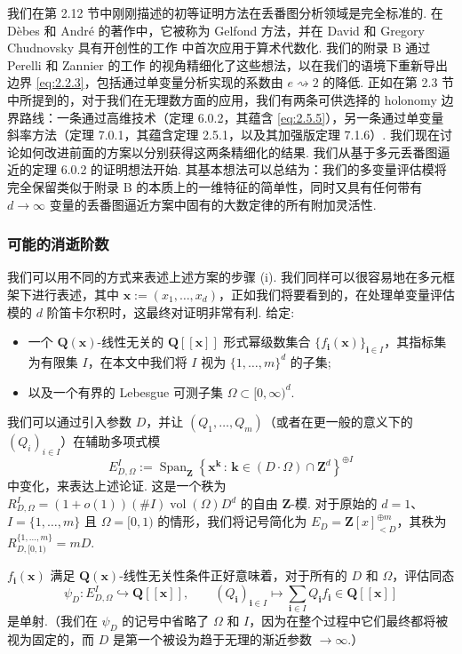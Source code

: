 我们在第 2.12 节中刚刚描述的初等证明方法在丢番图分析领域是完全标准的. 在 Dèbes \cite{Deb86} 和 André \cite[§ VIII.3]{And89} 的著作中，它被称为 Gelfond 方法，并在 David 和 Gregory Chudnovsky 具有开创性的工作 \cite{CC85b, CC85c} 中首次应用于算术代数化. 我们的附录 B 通过 Perelli 和 Zannier 的工作 \cite{PZ84} 的视角精细化了这些想法，以在我们的语境下重新导出边界 \eqref{eq:2.2.3}，包括通过单变量分析实现的系数由 $e \rightsquigarrow 2$ 的降低. 正如在第 2.3 节中所提到的，对于我们在无理数方面的应用，我们有两条可供选择的 holonomy 边界路线：一条通过高维技术（定理 6.0.2，其蕴含 \eqref{eq:2.5.5}），另一条通过单变量斜率方法（定理 7.0.1，其蕴含定理 2.5.1，以及其加强版定理 7.1.6）. 我们现在讨论如何改进前面的方案以分别获得这两条精细化的结果. 我们从基于多元丢番图逼近的定理 6.0.2 的证明想法开始. 其基本想法可以总结为：我们的多变量评估模将完全保留类似于附录 B 的本质上的一维特征的简单性，同时又具有任何带有 $d \to \infty$ 变量的丢番图逼近方案中固有的大数定律的所有附加灵活性.

\subsubsection{可能的消逝阶数}\label{sec:2.13.1}
我们可以用不同的方式来表述上述方案的步骤 (i). 我们同样可以很容易地在多元框架下进行表述，其中 $\mathbf{x} := (x_1, \dots, x_d)$，正如我们将要看到的，在处理单变量评估模的 $d$ 阶笛卡尔积时，这最终对证明非常有利. 给定:
\begin{itemize}
  \item 一个 $\mathbf{Q}(\mathbf{x})$-线性无关的 $\mathbf{Q}[\![\mathbf{x}]\!]$ 形式幂级数集合 $\{f_{\mathbf{i}}(\mathbf{x})\}_{\mathbf{i}\in I}$，其指标集为有限集 $I$，在本文中我们将 $I$ 视为 $\{1,\dots,m\}^d$ 的子集;
  \item 以及一个有界的 Lebesgue 可测子集 $\Omega \subset [0, \infty)^d$.
\end{itemize}
我们可以通过引入参数 $D$，并让 $(Q_1, \dots, Q_m)$（或者在更一般的意义下的 $(Q_i)_{i \in I}$）在辅助多项式模
\[ E_{D,\Omega}^I := \operatorname{Span}_{\mathbf{Z}} \left\{ \mathbf{x}^{\mathbf{k}} \, : \, \mathbf{k} \in (D \cdot \Omega) \cap \mathbf{Z}^d \right\}^{\oplus I} \]
中变化，来表达上述论证. 这是一个秩为 $R_{D,\Omega}^I = (1+o(1))(\#I)\operatorname{vol}(\Omega)D^d$ 的自由 $\mathbf{Z}$-模. 对于原始的 $d=1$、$I=\{1,\dots,m\}$ 且 $\Omega=[0,1)$ 的情形，我们将记号简化为 $E_D = \mathbf{Z}[x]_{< D}^{\oplus m}$，其秩为 $R_{D,[0,1)}^{\{1,\dots,m\}} = mD$.

$f_{\mathbf{i}}(\mathbf{x})$ 满足 $\mathbf{Q}(\mathbf{x})$-线性无关性条件正好意味着，对于所有的 $D$ 和 $\Omega$，评估同态
\[ \psi_D: E_{D,\Omega}^I \hookrightarrow \mathbf{Q}[\![\mathbf{x}]\!], \qquad (Q_{\mathbf{i}})_{\mathbf{i} \in I} \mapsto \sum_{\mathbf{i} \in I} Q_{\mathbf{i}} f_{\mathbf{i}} \in \mathbf{Q}[\![\mathbf{x}]\!] \]
是单射.（我们在 $\psi_D$ 的记号中省略了 $\Omega$ 和 $I$，因为在整个过程中它们最终都将被视为固定的，而 $D$ 是第一个被设为趋于无理的渐近参数 $\to \infty$.）

